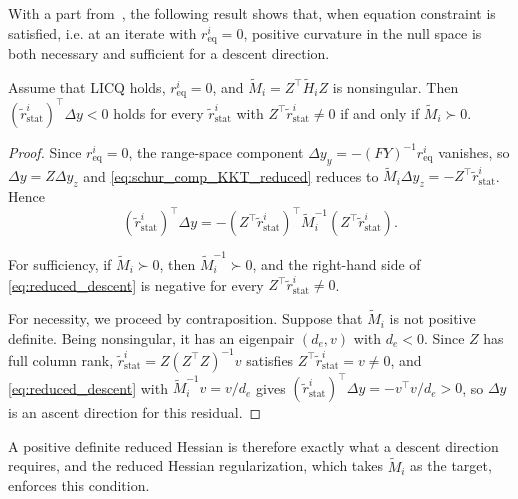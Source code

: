 \documentclass[class=scrbook, crop=false]{standalone}
\begin{document}
With a part from~\cite[Theorem~16.6]{nocedal2006numerical}, 
the following result shows that, 
when equation constraint is satisfied, i.e. at an iterate with $r_{\mathrm{eq}}^i = 0$,
positive curvature in the null space is both necessary and sufficient for a descent direction.

\begin{theorem}
    \label{thm:reduced_hessian_descent}
    Assume that LICQ holds, $r_{\mathrm{eq}}^i = 0$, and $\tilde{M}_i = Z^\top \tilde{H}_i Z$ is nonsingular.
    Then $(\tilde{r}_{\mathrm{stat}}^i)^\top \Delta y < 0$ holds for every $\tilde{r}_{\mathrm{stat}}^i$
    with $Z^\top \tilde{r}_{\mathrm{stat}}^i \neq 0$ if and only if $\tilde{M}_i \succ 0$.
\end{theorem}

\begin{proof}
    Since $r_{\mathrm{eq}}^i = 0$, the range-space component $\Delta y_y = -(FY)^{-1} r_{\mathrm{eq}}^i$ vanishes,
    so $\Delta y = Z \Delta y_z$ and \eqref{eq:schur_comp_KKT_reduced} reduces to
    $\tilde{M}_i \Delta y_z = -Z^\top \tilde{r}_{\mathrm{stat}}^i$. Hence
    \begin{equation}
        \label{eq:reduced_descent}
        (\tilde{r}_{\mathrm{stat}}^i)^\top \Delta y
        = -(Z^\top \tilde{r}_{\mathrm{stat}}^i)^\top \tilde{M}_i^{-1} (Z^\top \tilde{r}_{\mathrm{stat}}^i).
    \end{equation}

    For sufficiency, if $\tilde{M}_i \succ 0$, then $\tilde{M}_i^{-1} \succ 0$,
    and the right-hand side of \eqref{eq:reduced_descent} is negative for every $Z^\top \tilde{r}_{\mathrm{stat}}^i \neq 0$.

    For necessity, we proceed by contraposition.
    Suppose that $\tilde{M}_i$ is not positive definite.
    Being nonsingular, it has an eigenpair $(d_e, v)$ with $d_e < 0$.
    Since $Z$ has full column rank, $\tilde{r}_{\mathrm{stat}}^i = Z (Z^\top Z)^{-1} v$ satisfies $Z^\top \tilde{r}_{\mathrm{stat}}^i = v \neq 0$,
    and \eqref{eq:reduced_descent} with $\tilde{M}_i^{-1} v = v/d_e$ gives
    $(\tilde{r}_{\mathrm{stat}}^i)^\top \Delta y = -v^\top v / d_e > 0$, so $\Delta y$ is an ascent direction for this residual.
\end{proof}

A positive definite reduced Hessian is therefore exactly what a descent direction requires,
and the reduced Hessian regularization, which takes $\tilde{M}_i$ as the target, enforces this condition.
\end{document}
